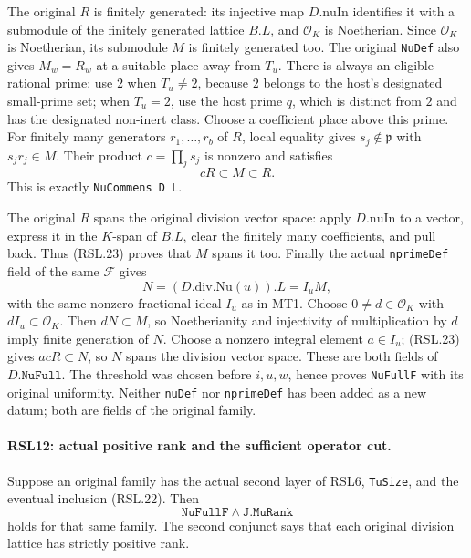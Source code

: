 The original $R$ is finitely generated: its injective map
$D.\mathrm{nuIn}$ identifies it with a submodule of the
finitely generated lattice $B.L$, and $\mathcal O_K$ is
Noetherian.  Since
$\mathcal O_K$ is Noetherian, its submodule $M$ is finitely
generated too.  The original \texttt{NuDef} also gives
$M_w=R_w$ at a suitable place away from $T_u$.  There is
always an eligible rational prime: use $2$ when $T_u\ne2$,
because $2$ belongs to the host's designated small-prime set;
when $T_u=2$, use the host prime $q$, which is distinct from
$2$ and has the designated non-inert class.  Choose a
coefficient place above this prime.  For finitely many
generators $r_1,\ldots,r_b$ of $R$, local equality gives
$s_j\notin\mathfrak p$ with $s_jr_j\in M$.
Their product $c=\prod_j s_j$ is nonzero and satisfies
\[
                              cR\subset M\subset R.             \tag{RSL.23}
\]
This is exactly \texttt{NuCommens D L}.

The original $R$ spans the original division vector space:
apply $D.\mathrm{nuIn}$ to a vector, express it in the
$K$-span of $B.L$, clear the finitely many coefficients,
and pull back.  Thus (RSL.23) proves that $M$ spans it too.
Finally the actual \texttt{nprimeDef} field of the same
$\mathcal F$ gives
\[
                 N=(D.\mathrm{div}.\mathrm{Nu}(u)).L=I_u M,
                                                                  \tag{RSL.24}
\]
with the same nonzero fractional ideal $I_u$ as in MT1.
Choose $0\ne d\in\mathcal O_K$ with $dI_u\subset\mathcal O_K$.
Then $dN\subset M$, so Noetherianity and injectivity of
multiplication by $d$ imply finite generation of $N$.
Choose a nonzero integral element $a\in I_u$; (RSL.23)
gives $acR\subset N$, so $N$ spans the division vector
space.  These are both fields of $D.\texttt{NuFull}$.
The threshold was chosen before $i,u,w$, hence proves
\texttt{NuFullF} with its original uniformity.  Neither
\texttt{nuDef} nor \texttt{nprimeDef} has been added as a
new datum; both are fields of the original family.

\paragraph{RSL12: actual positive rank and the sufficient operator cut.}
\label{claim:RSL12}
Suppose an original family has the actual second layer of
RSL6, \texttt{TuSize}, and the eventual inclusion (RSL.22).
Then
\[
                   \texttt{NuFullF}\ \wedge\ \texttt{J.MuRank}
                                                                  \tag{RSL.25}
\]
holds for that same family.  The second conjunct says that
each original division lattice has strictly positive rank.

